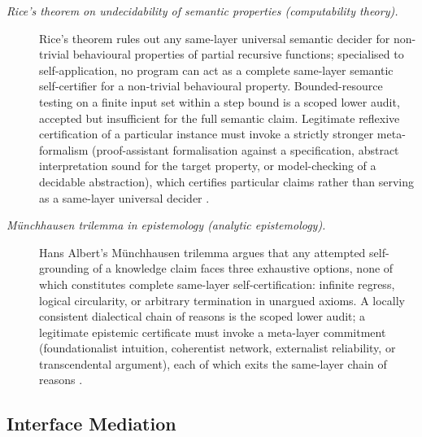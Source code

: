 \documentclass[11pt]{article}
\theoremstyle{definition}
\begin{document}
\begin{description}
\item[\emph{Rice's theorem on undecidability of semantic
properties (computability theory).}]
Rice's theorem rules out any same-layer universal
semantic decider for non-trivial behavioural properties
of partial recursive functions; specialised to
self-application, no program can act as a complete
same-layer
semantic self-certifier for a non-trivial behavioural
property.  Bounded-resource testing on a finite input
set within a step bound is a scoped lower audit, accepted
but insufficient for the full semantic claim.  Legitimate
reflexive certification of a particular instance must
invoke a strictly stronger meta-formalism (proof-assistant
formalisation against a specification, abstract
interpretation sound for the target property, or
model-checking of a decidable abstraction), which
certifies particular claims rather than serving as a
same-layer universal decider \citep{Rice1953Classes}.

\item[\emph{M\"unchhausen trilemma in epistemology
(analytic epistemology).}]
Hans Albert's M\"unchhausen trilemma argues that any
attempted self-grounding of a knowledge claim faces
three exhaustive options, none of which constitutes
complete same-layer self-certification: infinite
regress, logical circularity, or arbitrary termination
in unargued axioms.  A locally consistent dialectical
chain of reasons is the scoped lower audit; a legitimate
epistemic certificate must invoke a meta-layer
commitment (foundationalist intuition, coherentist
network, externalist reliability, or transcendental
argument), each of which exits the same-layer chain of
reasons \citep{Albert1985TreatiseCriticalReason}.
\end{description}

\subsection{Interface Mediation}\label{sec:status-records-coherence:interface-mediation}
\end{document}
